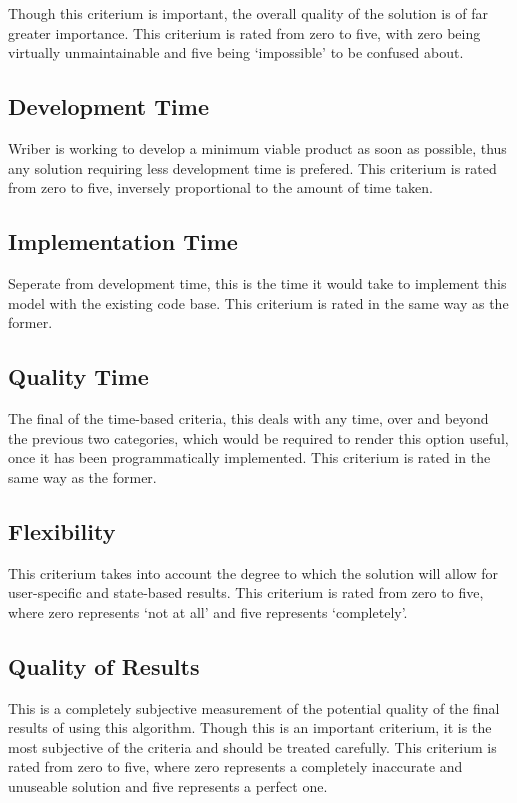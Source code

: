 \documentclass[12pt]{article}
\begin{document}
Though this criterium is important, the overall quality of the solution is of far greater importance. This criterium is rated from zero to five, with zero being virtually unmaintainable and five being `impossible' to be confused about.

\subsection{Development Time}
Wriber is working to develop a minimum viable product as soon as possible, thus any solution requiring less development time is prefered. This criterium is rated from zero to five, inversely proportional to the amount of time taken.

\subsection{Implementation Time}
Seperate from development time, this is the time it would take to implement this model with the existing code base. This criterium is rated in the same way as the former.

\subsection{Quality Time}
The final of the time-based criteria, this deals with any time, over and beyond the previous two categories, which would be required to render this option useful, once it has been programmatically implemented. This criterium is rated in the same way as the former.

\subsection{Flexibility}
This criterium takes into account the degree to which the solution will allow for user-specific and state-based results. This criterium is rated from zero to five, where zero represents `not at all' and five represents `completely'.

\subsection{Quality of Results}
This is a completely subjective measurement of the potential quality of the final results of using this algorithm. Though this is an important criterium, it is the most subjective of the criteria and should be treated carefully. This criterium is rated from zero to five, where zero represents a completely inaccurate and unuseable solution and five represents a perfect one.
\newpage
\end{document}
